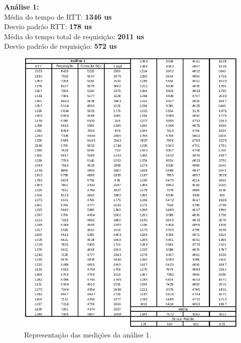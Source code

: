 \documentclass[11pt,twoside]{article}
\begin{document}
\textbf{Análise 1: }\\
Média do tempo de RTT: \textbf{1346 us}\\
Desvio padrão RTT: \textbf{178 us}\\
Média do tempo total de requisição: \textbf{2011 us}\\
Desvio padrão de requisição: \textbf{572 us}\\
\begin{figure}[htb]
  \centering
  \includegraphics[width=15cm]{analise1.png} 
  \caption{Representação das medições da análise 1.}
  \label{fig:analise1}
\end{figure}
\end{document}
